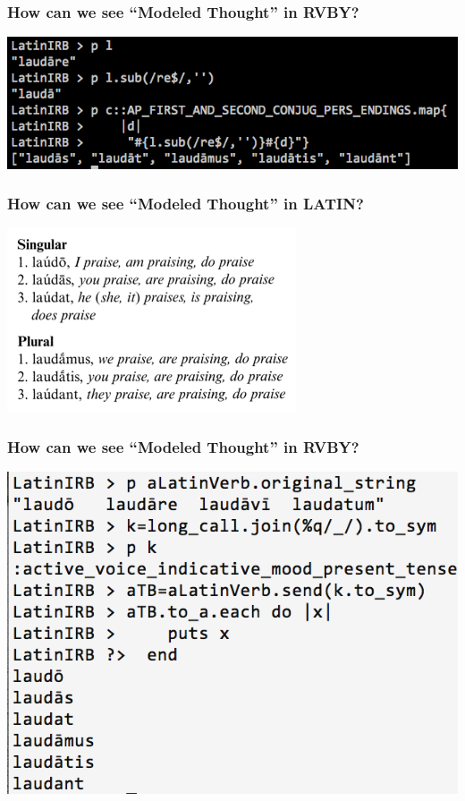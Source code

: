 \documentclass[slidestop,compress,mathserif,notes]{beamer}
\begin{document}
\begin{frame}
	\frametitle{How can we see ``Modeled Thought'' in \textsc{RVBY}?} 
		\includegraphics[scale=0.45]{img/conj_how_2b.png}	
\end{frame}


\begin{frame}
	\frametitle{How can we see ``Modeled Thought'' in \textsc{LATIN}?} 
	\includegraphics[scale=0.45]{img/conj_how_3.png}	
\end{frame}

\begin{frame}
	\frametitle{How can we see ``Modeled Thought'' in \textsc{RVBY}?} 
	\includegraphics[scale=0.45]{img/conj_how_3b.png}	
\end{frame}
\end{document}
